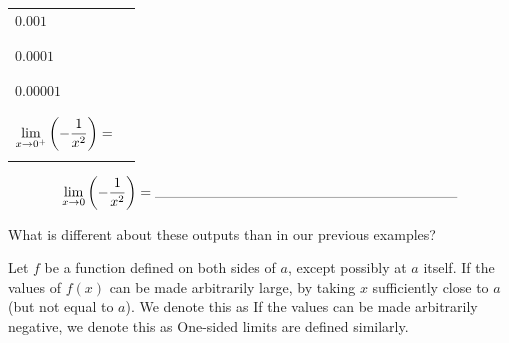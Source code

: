 \documentclass[notes]{subfiles}
\begin{document}
\begin{ex}
\begin{center}
\begin{minipage}{.45\textwidth}
\begin{tabu}{|X[c]|X[1.5,c]|}
						$ 0.001$	& \\ 
												& \\ \hline
												& \\ 
						$ 0.0001$	& \\ 
												& \\ \hline
												& \\
						$ 0.00001$	&\\
												&\\ \hline\hline
												&\\
						$\displaystyle \lim_{x\to 0^+}\left( -\dfrac{1}{x^2}\right) =$ & \\
												&\\ \hline
					\end{tabu}
				\end{minipage}
				\[\lim_{x\to 0}\lrpar{-\dfrac{1}{x^2}}= \blank{3}\]
			\end{center}	
		\end{ex}		
			
		\begin{question}
			What is different about these outputs than in our previous examples?
		\end{question}
			
		\begin{rmk}[Notation]
		\end{rmk}
			\newpage
			
		\begin{defn}
			Let $f$ be a function defined on both sides of $a$, except possibly at $a$ itself.  If the values of $f(x)$ can be made arbitrarily large, by taking $x$ sufficiently close to $a$ (but not equal to $a$).  We denote this as
			If the values can be made arbitrarily negative, we denote this as \newline
			One-sided limits are defined similarly.
		\end{defn}
					
\end{document}
